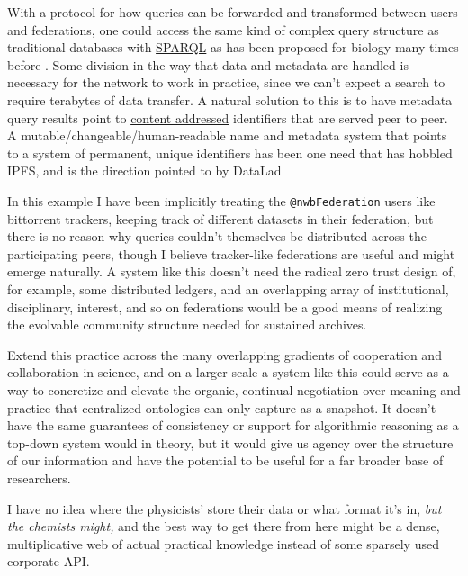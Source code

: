 \documentclass[10pt]{article}
\begin{document}
\begin{multicols}{2}
With a protocol for how queries can be forwarded and transformed between
users and federations, one could access the same kind of complex query
structure as traditional databases with
\href{https://www.w3.org/TR/sparql11-federated-query/}{SPARQL} \cite{SPARQLFederatedQuery2013}  as has been proposed for biology many
times before \cite{simaEnablingSemanticQueries2019, djokic-petrovicPIBASFedSPARQLWebbased2017, hasnainBioFedFederatedQuery2017} . Some division in the way that data
and metadata are handled is necessary for the network to work in
practice, since we can't expect a search to require terabytes of data
transfer. A natural solution to this is to have metadata query results
point to
\href{https://en.wikipedia.org/wiki/Content-addressable_storage}{content
addressed} identifiers that are served peer to peer. A
mutable/changeable/human-readable name and metadata system that points
to a system of permanent, unique identifiers has been one need that has
hobbled IPFS, and is the direction pointed to by DataLad \cite{hankeDefenseDecentralizedResearch2021} 

In this example I have been implicitly treating the
\texttt{@nwbFederation} users like bittorrent trackers, keeping track of
different datasets in their federation, but there is no reason why
queries couldn't themselves be distributed across the participating
peers, though I believe tracker-like federations are useful and might
emerge naturally. A system like this doesn't need the radical zero trust
design of, for example, some distributed ledgers, and an overlapping
array of institutional, disciplinary, interest, and so on federations
would be a good means of realizing the evolvable community structure
needed for sustained archives.

Extend this practice across the many overlapping gradients of
cooperation and collaboration in science, and on a larger scale a system
like this could serve as a way to concretize and elevate the organic,
continual negotiation over meaning and practice that centralized
ontologies can only capture as a snapshot. It doesn't have the same
guarantees of consistency or support for algorithmic reasoning as a
top-down system would in theory, but it would give us agency over the
structure of our information and have the potential to be useful for a
far broader base of researchers.

I have no idea where the physicists' store their data or what format
it's in, \emph{but the chemists might,} and the best way to get there
from here might be a dense, multiplicative web of actual practical
knowledge instead of some sparsely used corporate API.


\end{multicols}
\end{document}
